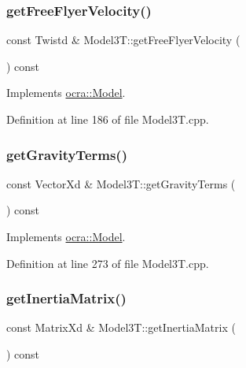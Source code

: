 \subsubsection{\texorpdfstring{get\+Free\+Flyer\+Velocity()}{getFreeFlyerVelocity()}}
{\footnotesize\ttfamily const Twistd \& Model3\+T\+::get\+Free\+Flyer\+Velocity (\begin{DoxyParamCaption}{ }\end{DoxyParamCaption}) const\hspace{0.3cm}{\ttfamily [virtual]}}



Implements \hyperlink{classocra_1_1Model_a0a11fff87a21ab37535420f7a7544c96}{ocra\+::\+Model}.



Definition at line 186 of file Model3\+T.\+cpp.

\hypertarget{classModel3T_a593775a88272c140518b679ad910a89c}{}\label{classModel3T_a593775a88272c140518b679ad910a89c} 
\subsubsection{\texorpdfstring{get\+Gravity\+Terms()}{getGravityTerms()}}
{\footnotesize\ttfamily const Vector\+Xd \& Model3\+T\+::get\+Gravity\+Terms (\begin{DoxyParamCaption}{ }\end{DoxyParamCaption}) const\hspace{0.3cm}{\ttfamily [virtual]}}



Implements \hyperlink{classocra_1_1Model_aef569d0c71ab76665e4a24d178e8243d}{ocra\+::\+Model}.



Definition at line 273 of file Model3\+T.\+cpp.

\hypertarget{classModel3T_a0ba3b76d91e6121e472ab316e17382e1}{}\label{classModel3T_a0ba3b76d91e6121e472ab316e17382e1} 
\subsubsection{\texorpdfstring{get\+Inertia\+Matrix()}{getInertiaMatrix()}}
{\footnotesize\ttfamily const Matrix\+Xd \& Model3\+T\+::get\+Inertia\+Matrix (\begin{DoxyParamCaption}{ }\end{DoxyParamCaption}) const\hspace{0.3cm}{\ttfamily [virtual]}}



